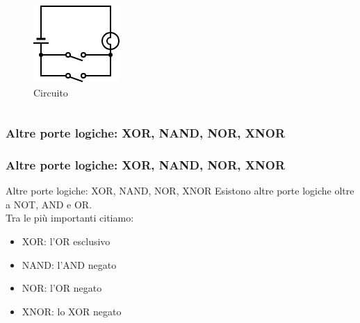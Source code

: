 \begin{frame}
\begin{columns}
		\begin{figure}[!htbp]
			\centering 
			\includegraphics[width=0.85\linewidth]{images/2_elettronica/logic_gate_circuit_or.png}
			\caption{Circuito}
		\end{figure}
		
	\end{columns}
	
\end{frame}



\subsubsection[Altre porte logiche: XOR, NAND, NOR, XNOR]{Altre porte logiche: XOR, NAND, NOR, XNOR}
\begin{frame}
	\frametitle{Altre porte logiche: XOR, NAND, NOR, XNOR}
	
	
	\begin{block}{Altre porte logiche: XOR, NAND, NOR, XNOR}
		Esistono altre porte logiche oltre a NOT, AND e OR.\\
		Tra le più importanti citiamo:
		\begin{itemize}
			\item XOR: l'OR esclusivo
			\item NAND: l'AND negato
			\item NOR: l'OR negato
			\item XNOR: lo XOR negato
		\end{itemize}
	\end{block}
	
\end{frame}


